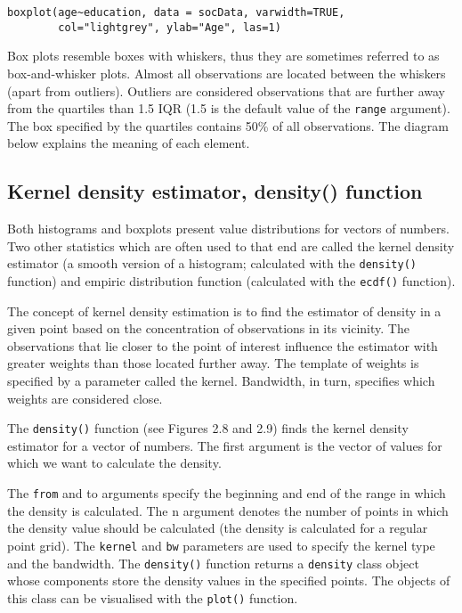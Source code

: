 \documentclass[]{book}
\theoremstyle{definition}
\theoremstyle{definition}
\theoremstyle{definition}
\theoremstyle{remark}
\begin{document}
\begin{verbatim}
boxplot(age~education, data = socData, varwidth=TRUE,
        col="lightgrey", ylab="Age", las=1)
\end{verbatim}

Box plots resemble boxes with whiskers, thus they are sometimes referred
to as box-and-whisker plots. Almost all observations are located between
the whiskers (apart from outliers). Outliers are considered observations
that are further away from the quartiles than 1.5 IQR (1.5 is the
default value of the \texttt{range} argument). The box specified by the
quartiles contains 50\% of all observations. The diagram below explains
the meaning of each element.

\subsection{Kernel density estimator, density()
function}\label{part_244}

Both histograms and boxplots present value distributions for vectors of
numbers. Two other statistics which are often used to that end are
called the kernel density estimator (a smooth version of a histogram;
calculated with the \texttt{density()} function) and empiric
distribution function (calculated with the \texttt{ecdf()} function).

The concept of kernel density estimation is to find the estimator of
density in a given point based on the concentration of observations in
its vicinity. The observations that lie closer to the point of interest
influence the estimator with greater weights than those located further
away. The template of weights is specified by a parameter called the
kernel. Bandwidth, in turn, specifies which weights are considered
close.

The \texttt{density()} function (see Figures 2.8 and 2.9) finds the
kernel density estimator for a vector of numbers. The first argument is
the vector of values for which we want to calculate the density.

The \texttt{from} and to arguments specify the beginning and end of the
range in which the density is calculated. The n argument denotes the
number of points in which the density value should be calculated (the
density is calculated for a regular point grid). The \texttt{kernel} and
\texttt{bw} parameters are used to specify the kernel type and the
bandwidth. The \texttt{density()} function returns a \texttt{density}
class object whose components store the density values in the specified
points. The objects of this class can be visualised with the
\texttt{plot()} function.
\end{document}
